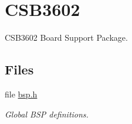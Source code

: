 \hypertarget{group__RTEMSBSPsM68kCSB3602}{}\section{C\+S\+B3602}
\label{group__RTEMSBSPsM68kCSB3602}


C\+S\+B3602 Board Support Package.  


\subsection*{Files}
\begin{DoxyCompactItemize}
\item 
file \mbox{\hyperlink{bsps_2m68k_2csb360_2include_2bsp_8h}{bsp.\+h}}
\begin{DoxyCompactList}\small\item\em Global B\+SP definitions. \end{DoxyCompactList}\end{DoxyCompactItemize}
